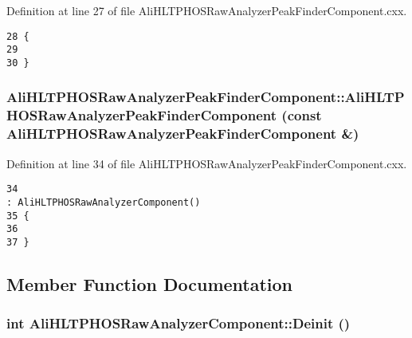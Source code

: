 Definition at line 27 of file Ali\-HLTPHOSRaw\-Analyzer\-Peak\-Finder\-Component.cxx.

\footnotesize\begin{verbatim}28 {
29 
30 }
\end{verbatim}\normalsize 


\subsubsection{\setlength{\rightskip}{0pt plus 5cm}Ali\-HLTPHOSRaw\-Analyzer\-Peak\-Finder\-Component::Ali\-HLTPHOSRaw\-Analyzer\-Peak\-Finder\-Component (const {\bf Ali\-HLTPHOSRaw\-Analyzer\-Peak\-Finder\-Component} \&)}\label{classAliHLTPHOSRawAnalyzerPeakFinderComponent_AliHLTPHOSRawAnalyzerPeakFinderComponenta2}




Definition at line 34 of file Ali\-HLTPHOSRaw\-Analyzer\-Peak\-Finder\-Component.cxx.

\footnotesize\begin{verbatim}34                                                                                                                                     : AliHLTPHOSRawAnalyzerComponent()
35 {
36 
37 }
\end{verbatim}\normalsize 




\subsection{Member Function Documentation}
\subsubsection{\setlength{\rightskip}{0pt plus 5cm}int Ali\-HLTPHOSRaw\-Analyzer\-Component::Deinit ()\hspace{0.3cm}{\tt  [virtual, inherited]}}\label{classAliHLTPHOSRawAnalyzerComponent_AliHLTPHOSRawAnalyzerPeakFinderComponenta7}




